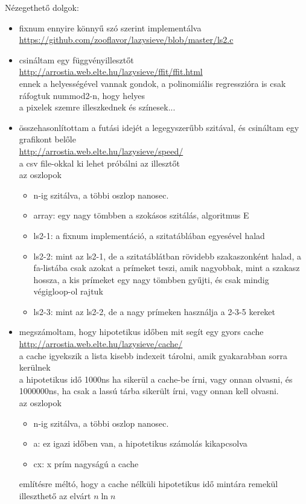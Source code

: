 \documentclass[a4paper]{article}
\begin{document}
Nézegethető dolgok:
\begin{itemize}
\item fixnum ennyire könnyű szó szerint implementálva \\
	\url{https://github.com/zooflavor/lazysieve/blob/master/ls2.c}
\item csináltam egy függvényillesztőt \\
	\url{http://arrostia.web.elte.hu/lazysieve/ffit/ffit.html} \\
	ennek a helyességével vannak gondok, a polinomiális regresszióra is csak
	ráfogtuk nummod2-n, hogy helyes \\
	a pixelek szemre illeszkednek és színesek...
\item összehasonlítottam a futási idejét a legegyszerűbb szitával,
	és csináltam egy grafikont belőle \\
	\url{http://arrostia.web.elte.hu/lazysieve/speed/} \\
	a csv file-okkal ki lehet próbálni az illesztőt \\
	az oszlopok
	\begin{itemize}
	\item n-ig szitálva, a többi oszlop nanosec.
	\item array: egy nagy tömbben a szokásos szitálás, algoritmus E
	\item ls2-1: a fixnum implementáció, a szitatáblában egyesével halad
	\item ls2-2: mint az ls2-1, de a szitatáblátban rövidebb szakaszonként halad,
		a fa-listába csak azokat a prímeket teszi, amik nagyobbak, mint a szakasz hossza,
		a kis prímeket egy nagy tömbben gyűjti, és csak mindig végigloop-ol rajtuk
	\item ls2-3: mint az ls2-2, de a nagy prímeken használja a 2-3-5 kereket
	\end{itemize}
\item megszámoltam, hogy hipotetikus időben mit segít egy gyors cache \\
	 \url{http://arrostia.web.elte.hu/lazysieve/cache/} \\
	 a cache igyekszik a lista kisebb indexeit tárolni, amik gyakarabban sorra kerülnek \\
	 a hipotetikus idő 1000ns ha sikerül a cache-be írni, vagy onnan olvasni, és 1000000ns,
	 ha csak a lassú tárba sikerült írni, vagy onnan kell olvasni. \\
	az oszlopok
	\begin{itemize}
	\item n-ig szitálva, a többi oszlop nanosec.
	\item a: ez igazi időben van, a hipotetikus számolás kikapcsolva
	\item cx: x prím nagyságú a cache
	\end{itemize}
	említésre méltó, hogy a cache nélküli hipotetikus idő mintára remekül illeszthető
	az elvárt $n \ln{n}$
\end{itemize}
\end{document}
